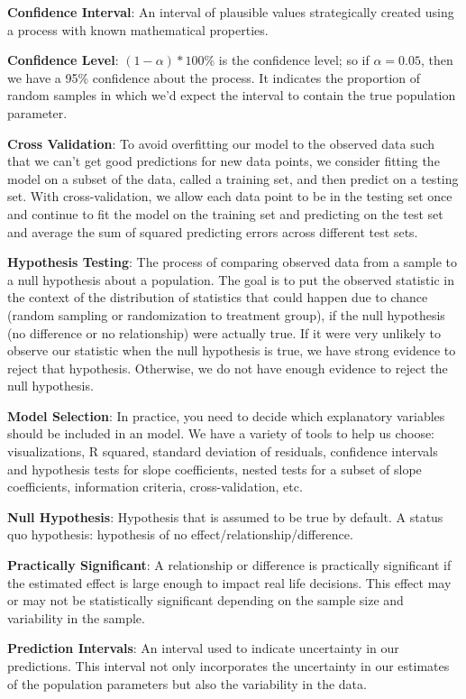 \documentclass[]{book}
\begin{document}
\textbf{Confidence Interval}: An interval of plausible values strategically created using a process with known mathematical properties.

\textbf{Confidence Level}: \((1-\alpha)*100\%\) is the confidence level; so if \(\alpha = 0.05\), then we have a 95\% confidence about the process. It indicates the proportion of random samples in which we'd expect the interval to contain the true population parameter.

\textbf{Cross Validation}: To avoid overfitting our model to the observed data such that we can't get good predictions for new data points, we consider fitting the model on a subset of the data, called a training set, and then predict on a testing set. With cross-validation, we allow each data point to be in the testing set once and continue to fit the model on the training set and predicting on the test set and average the sum of squared predicting errors across different test sets.

\textbf{Hypothesis Testing}: The process of comparing observed data from a sample to a null hypothesis about a population. The goal is to put the observed statistic in the context of the distribution of statistics that could happen due to chance (random sampling or randomization to treatment group), if the null hypothesis (no difference or no relationship) were actually true. If it were very unlikely to observe our statistic when the null hypothesis is true, we have strong evidence to reject that hypothesis. Otherwise, we do not have enough evidence to reject the null hypothesis.

\textbf{Model Selection}: In practice, you need to decide which explanatory variables should be included in an model. We have a variety of tools to help us choose: visualizations, R squared, standard deviation of residuals, confidence intervals and hypothesis tests for slope coefficients, nested tests for a subset of slope coefficients, information criteria, cross-validation, etc.

\textbf{Null Hypothesis}: Hypothesis that is assumed to be true by default. A status quo hypothesis: hypothesis of no effect/relationship/difference.

\textbf{Practically Significant}: A relationship or difference is practically significant if the estimated effect is large enough to impact real life decisions. This effect may or may not be statistically significant depending on the sample size and variability in the sample.

\textbf{Prediction Intervals}: An interval used to indicate uncertainty in our predictions. This interval not only incorporates the uncertainty in our estimates of the population parameters but also the variability in the data.
\end{document}
